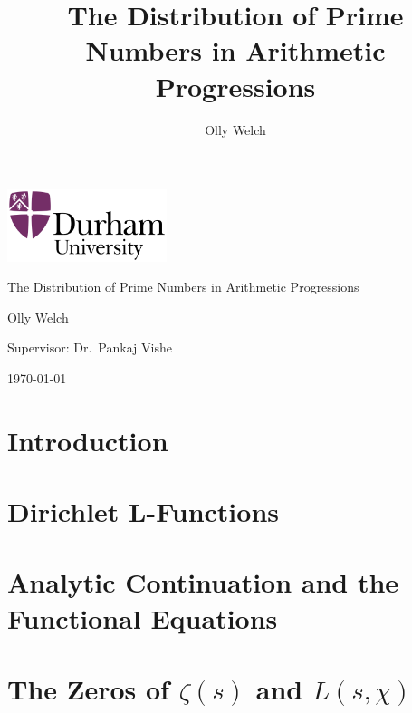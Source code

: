 \documentclass[11pt]{report} %
\title{The Distribution of Prime Numbers in Arithmetic Progressions}
\author{Olly Welch}
\numberwithin{equation}{chapter}
\theoremstyle{definition}
\theoremstyle{remark}
\begin{document}

\begin{titlepage}
	\centering
	\includegraphics[width=0.35\textwidth]{University_of_Durham_logo.png}\par\vspace{1cm}
	\vspace{1cm}
	{\LARGE The Distribution of Prime Numbers in Arithmetic Progressions\par}
	\vspace{1.5cm}
	{\Large Olly Welch\par}
		\vspace{0.5cm}
	{\large Supervisor:
	Dr.~Pankaj Vishe}

	\vfill

	{\large \today\par}
\end{titlepage}

\tableofcontents
{}



\chapter{Introduction}

\chapter{Dirichlet L-Functions}





\chapter{Analytic Continuation and the Functional Equations}



\chapter{The Zeros of \texorpdfstring{$\zeta(s)$}{Lg} and \texorpdfstring{$L(s, \chi)$}{Lg}}






\end{document}
